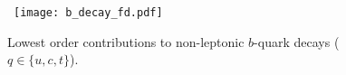 
\begin{figure}[t]
\centerline{
\hbox{
\texttt{[image: b\_decay\_fd.pdf]}\hspace{0.2cm} }}
\caption{Lowest order contributions to non-leptonic $b$-quark decays ($q\in\{u,c,t\}$). \label{b_decay_feynman_diagrams}}
\vskip -0.2cm
\end{figure}

